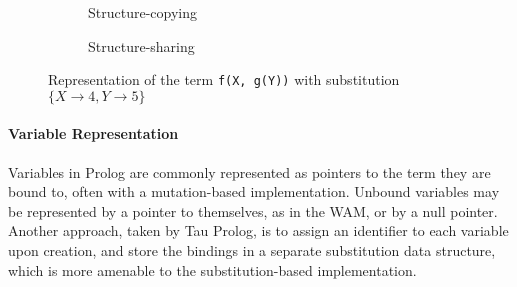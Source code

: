 \begin{figure}[H]
\centering
\begin{subfigure}{.5\textwidth}
\centering
{}
\caption{Structure-copying}
\end{subfigure}%
\begin{subfigure}{.5\textwidth}
\centering
{}
\caption{Structure-sharing}
\end{subfigure}
\caption{Representation of the term \texttt{f(X, g(Y))} with substitution $\{X \to 4, Y \to 5\}$}
\label{fig:term-representations}
\end{figure}

\paragraph{Variable Representation} Variables in Prolog are commonly represented as pointers to the term they are bound to, often with a mutation-based implementation. Unbound variables may be represented by a pointer to themselves, as in the WAM, or by a null pointer. Another approach, taken by Tau Prolog, is to assign an identifier to each variable upon creation, and store the bindings in a separate substitution data structure, which is more amenable to the substitution-based implementation.

